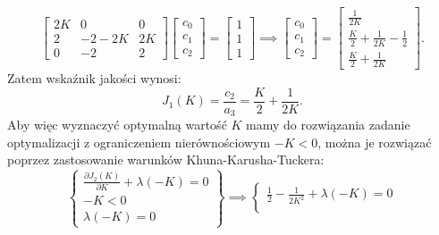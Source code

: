 \documentclass{article}
\begin{document}
\begin{enumerate}[(a)]
\begin{enumerate}[label=(\arabic*.)]
$$\begin{bmatrix}
                    2K & 0 & 0\\
                    2 & -2-2K & 2K\\
                    0 & -2 & 2
                \end{bmatrix}
                \begin{bmatrix}
                    c_{0}\\
                    c_{1}\\
                    c_{2}
                \end{bmatrix}
                =
                \begin{bmatrix}
                    1\\
                    1\\
                    1
                \end{bmatrix}
                \implies
                \begin{bmatrix}
                    c_{0}\\
                    c_{1}\\
                    c_{2}
                \end{bmatrix}
                =
                \begin{bmatrix}
                    \frac{1}{2K}\\
                    \frac{K}{2} + \frac{1}{2K} - \frac{1}{2}\\
                    \frac{K}{2} + \frac{1}{2K}
                \end{bmatrix}.
            $$
            Zatem wskaźnik jakości wynosi:
            $$
                J_{1}(K) = \frac{c_{2}}{a_{3}} = \frac{K}{2} + \frac{1}{2K}.
            $$
            Aby więc wyznaczyć optymalną wartość $K$ mamy do rozwiązania zadanie optymalizacji z ograniczeniem nierównościowym $-K < 0$, można je rozwiązać poprzez zastosowanie warunków Khuna-Karusha-Tuckera:
            $$
                \left\{
                \begin{array}{c}
                    \frac{\partial J_{2}(K)}{\partial K} + \lambda(-K) = 0\\
                    -K < 0\\
                    \lambda(-K) = 0
                \end{array}
                \right\}
                \implies
                \left\{
                \begin{array}{c}
                    \frac{1}{2} - \frac{1}{2K^2} + \lambda(-K) = 0\\

\end{array}$$
\end{enumerate}
\end{enumerate}
\end{document}
